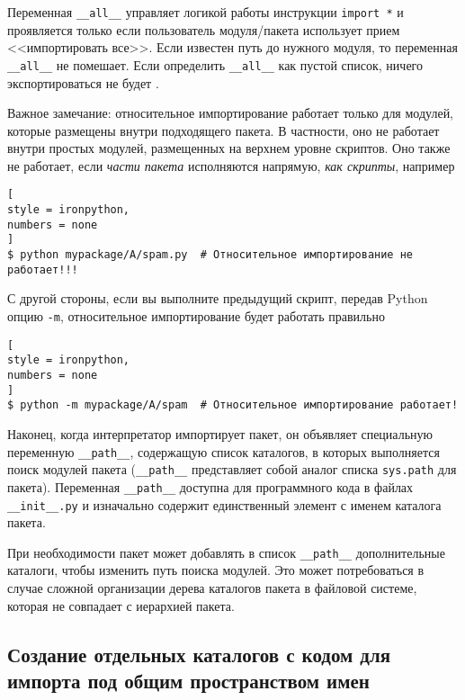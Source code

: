 \documentclass[%
	11pt,
	a4paper,
	utf8,
		]{article}
\begin{document}
Переменная \verb|__all__| управляет логикой работы инструкции \verb|import *| и проявляется только если пользователь модуля/пакета использует прием <<импортировать все>>. Если известен путь до нужного модуля, то переменная \verb|__all__| не помешает. Если определить \verb|__all__| как пустой список, ничего экспортироваться не будет \cite[]{beazley:python_cookbook-2019}.

Важное замечание: относительное импортирование работает только для модулей, которые размещены внутри подходящего пакета. В частности, оно не работает внутри простых модулей, размещенных на верхнем уровне скриптов. Оно также не работает, если \emph{части пакета} исполняются напрямую, \emph{как скрипты}, например \cite[]{beazley:python_cookbook-2019}
\begin{lstlisting}[
style = ironpython,
numbers = none
]
$ python mypackage/A/spam.py  # Относительное импортирование не работает!!!
\end{lstlisting}

С другой стороны, если вы выполните предыдущий скрипт, передав Python опцию \verb|-m|, относительное импортирование будет работать правильно
\begin{lstlisting}[
style = ironpython,
numbers = none
]
$ python -m mypackage/A/spam  # Относительное импортирование работает!
\end{lstlisting}





Наконец, когда интерпретатор импортирует пакет, он объявляет специальную переменную \verb|__path__|, содержащую список каталогов, в которых выполняется поиск модулей пакета (\verb|__path__| представляет собой аналог списка \texttt{sys.path} для пакета). Переменная \verb|__path__| доступна для программного кода в файлах \verb|__init__.py| и изначально содержит единственный элемент с именем каталога пакета.

При необходимости пакет может добавлять в список \verb|__path__| дополнительные каталоги, чтобы изменить путь поиска модулей. Это может потребоваться в случае сложной организации дерева каталогов пакета в файловой системе, которая не совпадает с иерархией пакета.

\subsection{Создание отдельных каталогов с кодом для импорта под общим пространством имен}
\end{document}
